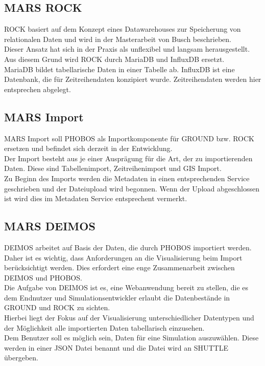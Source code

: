 \documentclass[10pt,conference,compsocconf]{IEEEtran}
\begin{document}
\subsection{MARS ROCK}
ROCK basiert auf dem Konzept eines Datawarehouses zur Speicherung von relationalen Daten und wird in der Masterarbeit von Busch\cite{JanBusch} beschrieben. \\
Dieser Ansatz hat sich in der Praxis als unflexibel und langsam herausgestellt. Aus diesem Grund wird ROCK durch MariaDB und InfluxDB ersetzt. \\
MariaDB bildet tabellarische Daten in einer Tabelle ab. InfluxDB ist eine Datenbank, die für Zeitreihendaten konzipiert wurde. Zeitreihendaten werden hier entsprechen abgelegt.


\subsection{MARS Import}
MARS Import soll PHOBOS als Importkomponente für GROUND bzw. ROCK ersetzen und befindet sich derzeit in der Entwicklung. \\
Der Import besteht aus je einer Ausprägung für die Art, der zu importierenden Daten. Diese sind Tabellenimport, Zeitreihenimport und GIS Import. \\
Zu Beginn des Imports werden die Metadaten in einen entsprechenden Service geschrieben und der Dateiupload wird begonnen. Wenn der Upload abgeschlossen ist wird dies im Metadaten Service entsprechent vermerkt.




\subsection{MARS DEIMOS}
\label{sub:deimos}
DEIMOS arbeitet auf Basis der Daten, die durch PHOBOS importiert werden. Daher ist es wichtig, dass Anforderungen an die Visualisierung beim Import berücksichtigt werden. Dies erfordert eine enge Zusammenarbeit zwischen DEIMOS und PHOBOS.\\
Die Aufgabe von DEIMOS ist es, eine Webanwendung bereit zu stellen, die es dem Endnutzer und Simulationsentwickler erlaubt die Datenbestände in GROUND und ROCK zu sichten.\\
Hierbei liegt der Fokus auf der Visualisierung unterschiedlicher Datentypen und der Möglichkeit alle importierten Daten tabellarisch einzusehen.\\
Dem Benutzer soll es möglich sein, Daten für eine Simulation auszuwählen. Diese werden in einer JSON Datei benannt und die Datei wird an SHUTTLE übergeben.
\end{document}
